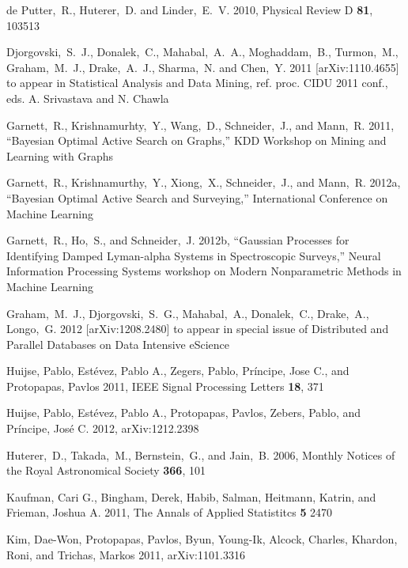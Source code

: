 \documentclass[useAMS,usenatbib,tightenlines,11pt,preprint]{aastex}
\begin{document}
\begin{thebibliography}{99}
de Putter,~R., Huterer,~D. and Linder,~E.~V. 2010, Physical Review D {\bf 81},
103513


Djorgovski,~S.~J., Donalek,~C., Mahabal,~A.~A., Moghaddam,~B., Turmon,~M.,
Graham,~M.~J., Drake,~A.~J., Sharma,~N. and Chen,~Y. 2011
[arXiv:1110.4655] to appear in Statistical Analysis and Data Mining, ref. proc.
CIDU 2011 conf., eds. A. Srivastava and N. Chawla

Garnett,~R., Krishnamurhty,~Y., Wang,~D., Schneider,~J., and Mann,~R. 2011,
``Bayesian Optimal Active Search on Graphs,'' KDD Workshop on Mining and
Learning with Graphs

Garnett,~R., Krishnamurthy,~Y., Xiong,~X., Schneider,~J., and Mann,~R. 2012a,
``Bayesian Optimal Active Search and Surveying,'' International Conference on
Machine Learning

Garnett,~R., Ho,~S., and Schneider,~J. 2012b,
``Gaussian Processes for Identifying Damped Lyman-alpha Systems in Spectroscopic
Surveys,'' Neural Information Processing Systems 
workshop on Modern Nonparametric Methods in Machine Learning

Graham,~M.~J., Djorgovski,~S.~G., Mahabal,~A., Donalek,~C., Drake,~A.,
Longo,~G. 2012 [arXiv:1208.2480] to appear in special issue of Distributed and
Parallel Databases on Data Intensive eScience

Huijse, Pablo, Est\'evez, Pablo A., Zegers, Pablo, Pr\'incipe, Jose C.,
and Protopapas, Pavlos 2011, IEEE Signal Processing Letters {\bf 18}, 371

Huijse, Pablo, Est\'evez, Pablo A., Protopapas, Pavlos, Zebers, Pablo,
and Pr\'incipe, Jos\'e C. 2012, arXiv:1212.2398

Huterer,~D., Takada,~M., Bernstein,~G., and Jain,~B. 2006,
Monthly Notices of the Royal Astronomical Society {\bf 366}, 101

Kaufman, Cari G., Bingham, Derek, Habib, Salman, Heitmann, Katrin, and Frieman,
Joshua A. 2011, The Annals of Applied Statistitcs {\bf 5} 2470

Kim, Dae-Won, Protopapas, Pavlos, Byun, Young-Ik, Alcock, Charles, Khardon,
Roni, and Trichas, Markos 2011, arXiv:1101.3316


\end{thebibliography}
\end{document}
